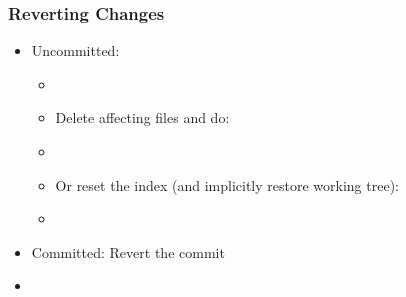 \begin{slide}[fragile]
  \frametitle{Reverting Changes}
  \begin{itemize}
    \item Uncommitted:
    \begin{itemize}
      \item[]
      \item Delete affecting files and do:
      \item[]
      \item Or reset the index (and implicitly restore working tree):
      \item[]
    \end{itemize}
    \item Committed: Revert the commit
    \item[]
  \end{itemize}
\end{slide}
